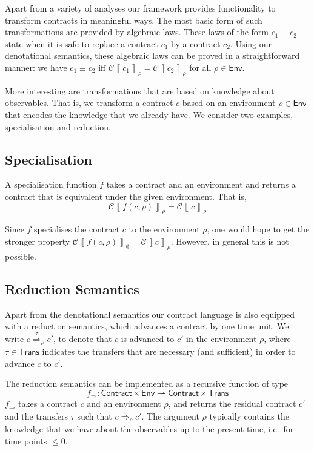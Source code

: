 \documentclass[a4paper,debug,twocolumn]{easychair}
\newcommand\type[1]{\mathsf{#1}}
\newcommand\pto{\rightharpoonup}
\newcommand\cSem[2]{{\mathcal C}\left\llbracket#1\right\rrbracket_{#2}}
\newcommand\cRed[2]{\stackrel{#2}\Rightarrow_{#1}}
\newcommand\cRedFun{f_{\Rightarrow}}
\theoremstyle{plain}
\begin{document}
Apart from a variety of analyses our framework provides functionality
to transform contracts in meaningful ways. The most basic form of such
transformations are provided by algebraic laws. These laws of the form
$c_1 \equiv c_2$ state when it is safe to replace a contract $c_1$ by
a contract $c_2$. Using our denotational semantics, these algebraic
laws can be proved in a straightforward manner: we have $c_1 \equiv
c_2$ iff $\cSem{c_1}\rho = \cSem{c_2}\rho$ for all $\rho \in
\type{Env}$.

More interesting are transformations that are based on knowledge about
observables. That is, we transform a contract $c$ based on an
environment $\rho \in \type{Env}$ that encodes the knowledge that we
already have. We consider two examples, specialisation and reduction.

\subsection{Specialisation}
\label{sec:specialisation}

A specialisation function $f$ takes a contract and an environment and
returns a contract that is equivalent under the given
environment. That is,
\[
\cSem{f(c,\rho)}\rho = \cSem c \rho
\]

Since $f$ specialises the contract $c$ to the environment $\rho$, one
would hope to get the stronger property $\cSem{f(c,\rho)}\emptyset =
\cSem c \rho$. However, in general this is not possible.

\subsection{Reduction Semantics}
\label{sec:reduction-semantics}


Apart from the denotational semantics our contract language is also
equipped with a reduction semantics, which advances a contract by one
time unit. We write $c \cRed \rho \tau c'$, to denote that $c$ is
advanced to $c'$ in the environment $\rho$, where $\tau \in
\type{Trans}$ indicates the transfers that are necessary (and
sufficient) in order to advance $c$ to $c'$.

The reduction semantics can be implemented as a recursive function of
type 
\[
\cRedFun \colon\type{Contract}\times \type{Env} \pto \type{Contract} \times \type{Trans}
\]
$\cRedFun$ takes a contract $c$ and an environment $\rho$, and returns
the residual contract $c'$ and the transfers $\tau$ such that $c
\cRed\rho\tau c'$. The argument $\rho$ typically contains the
knowledge that we have about the observables up to the present time,
i.e.\ for time points $\leq 0$.
\end{document}
